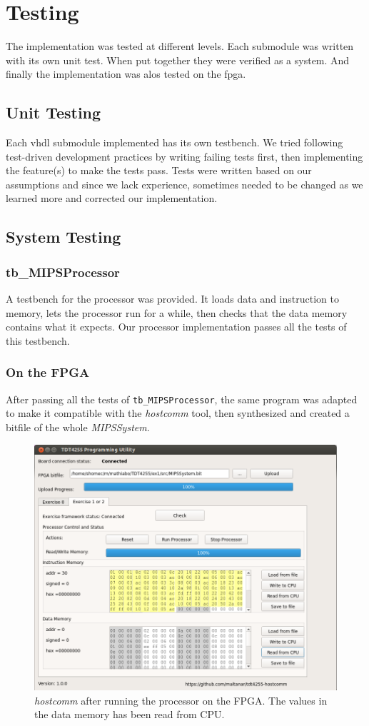 \section{Testing}
The implementation was tested at different levels.
Each submodule was written with its own unit test.
When put together they were verified as a system.
And finally the implementation was alos tested on the \gls{fpga}.

\subsection{Unit Testing}
Each \gls{vhdl} submodule implemented has its own testbench.
We tried following test-driven development practices by writing failing tests first, then implementing the feature(s) to make the tests pass.
Tests were written based on our assumptions and since we lack experience,
sometimes needed to be changed as we learned more and corrected our implementation.

\subsection{System Testing}
\subsubsection{tb\_MIPSProcessor}
A testbench for the processor was provided.
It loads data and instruction to memory,
lets the processor run for a while,
then checks that the data memory contains what it expects.
Our processor implementation passes all the tests of this testbench.

\subsubsection{On the FPGA}
After passing all the tests of \texttt{tb\_MIPSProcessor},
the same program was adapted to make it compatible with the \textit{hostcomm} tool,
then synthesized and created a bitfile of the whole \textit{MIPSSystem}.

\begin{figure}[p]
    \centering
    \includegraphics[width=\textwidth]{img/Hostcomm}
    \caption{\textit{hostcomm} after running the processor on the FPGA. The values in the data memory has been read from CPU.}
    \label{fig:hostcomm}
\end{figure}

